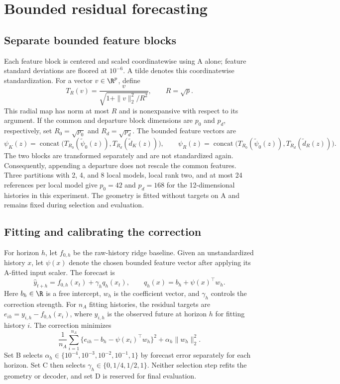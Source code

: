 \section{Bounded residual forecasting}\label{sec:bounded-decoder}

\subsection{Separate bounded feature blocks}


Each feature block is centered and scaled coordinatewise using A alone;
feature standard deviations are floored at $10^{-6}$. A tilde denotes
this coordinatewise standardization. For a vector $v\in\R^p$, define
\begin{equation}
 T_R(v)=\frac{v}{\sqrt{1+\|v\|_2^2/R^2}},\qquad R=\sqrt p.
 \label{eq:mechanism-main-radial}
\end{equation}
This radial map has norm at most $R$ and is nonexpansive with respect to
its argument. If the common and departure block dimensions are $p_0$
and $p_d$, respectively, set $R_0=\sqrt{p_0}$ and $R_d=\sqrt{p_d}$.
The bounded feature vectors are
\[
 \psi_K(z)=\operatorname{concat}\bigl(
       T_{R_0}(\widetilde\psi_0(z)),T_{R_d}(\widetilde d_K(z))\bigr),
 \qquad
 \psi_R(z)=\operatorname{concat}\bigl(
       T_{R_0}(\widetilde\psi_0(z)),T_{R_d}(\widetilde d_R(z))\bigr).
\]
The two blocks are transformed separately and are not standardized again.
Consequently, appending a departure does not rescale the common features.
Three partitions with 2, 4, and 8 local models, local rank two, and at
most 24 references per local model give $p_0=42$ and $p_d=168$ for the
12-dimensional histories in this experiment. The geometry is fitted
without targets on A and remains fixed during selection and evaluation.

\subsection{Fitting and calibrating the correction}

For horizon $h$, let $f_{0,h}$ be the raw-history ridge baseline. Given
an unstandardized history $x$, let $\psi(x)$ denote the chosen bounded
feature vector after applying its A-fitted input scaler. The forecast is
\begin{equation}
 \widehat y_{t+h}=f_{0,h}(x_t)+\gamma_h q_h(x_t),\qquad
 q_h(x)=b_h+\psi(x)^\top w_h.
 \label{eq:mechanism-main-forecast}
\end{equation}
Here $b_h\in\R$ is a free intercept, $w_h$ is the coefficient vector,
and $\gamma_h$ controls the correction strength. For $n_A$ fitting
histories, the residual targets are
$e_{ih}=y_{i,h}-f_{0,h}(x_i)$, where $y_{i,h}$ is the observed future
at horizon $h$ for fitting history $i$. The correction minimizes
\[
 \frac1{n_A}\sum_{i=1}^{n_A}
       \{e_{ih}-b_h-\psi(x_i)^\top w_h\}^2
       +\alpha_h\|w_h\|_2^2.
\]
Set B selects $\alpha_h\in\{10^{-4},10^{-3},10^{-2},10^{-1},1\}$
by forecast error separately for each horizon. Set C then selects
$\gamma_h\in\{0,1/4,1/2,1\}$. Neither selection step refits the
geometry or decoder, and set D is reserved for final evaluation.


